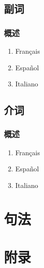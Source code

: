\documentclass[UTF8,a4paper,titlepage,10pt]{report}
\begin{document}
\chapter{副词}
\label{sec:orgb05879d}

\section{概述}
\label{sec:orgb56076e}

\begin{enumerate}
\item Français
\label{sec:orgfe48390}

\item Español
\label{sec:org4641af0}

\item Italiano
\label{sec:org7e93a23}
\end{enumerate}

\chapter{介词}
\label{sec:orgf53dd30}

\section{概述}
\label{sec:orgdd47123}

\begin{enumerate}
\item Français
\label{sec:orgb521d94}

\item Español
\label{sec:org0bfab7f}

\item Italiano
\label{sec:org17897da}
\end{enumerate}

\part{句法}
\label{sec:orgafab561}

\newpage
\part{附录}
\label{sec:org5169912}

\listoftables

\listoffigures

\printindex
\end{document}
